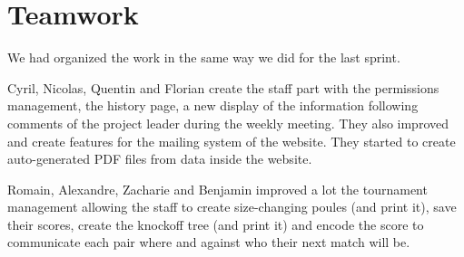 \section{Teamwork}

We had organized the work in the same way we did for the last sprint. \newline

Cyril, Nicolas, Quentin and Florian create the staff part with the permissions management, the history page, a new display of the information following comments of the project leader during the weekly meeting. They also improved and create features for the mailing system of the website. They started to create auto-generated PDF files from data inside the website. \newline

Romain, Alexandre, Zacharie and Benjamin improved a lot the tournament management allowing the staff to create size-changing poules (and print it), save their scores, create the knockoff tree (and print it) and encode the score to communicate each pair where and against who their next match will be. \newline
